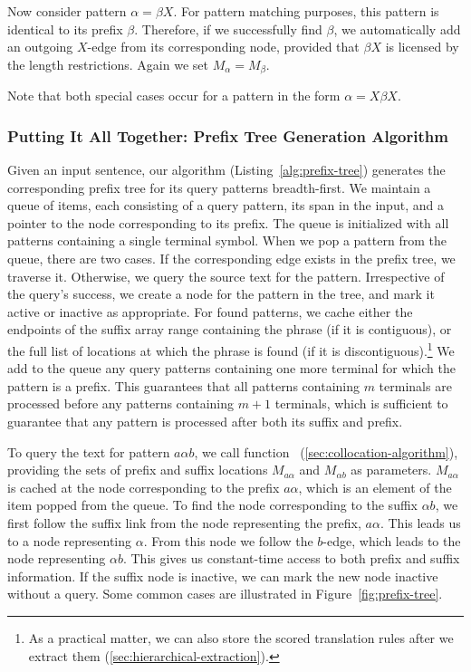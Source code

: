 Now consider pattern $\alpha = \beta{}X$.  For pattern matching purposes,
this pattern is identical to its prefix $\beta$.
Therefore, if we successfully find $\beta$, we automatically
add an outgoing $X$-edge from its corresponding node,
provided that $\beta{}X$ is licensed  
by the length restrictions.  Again we set $M_\alpha = M_\beta$.

Note that both special cases occur for a pattern in the form $\alpha = X\beta{}X$.

\subsubsection{Putting It All Together: Prefix Tree Generation Algorithm}\label{sec:prefix-trees}

Given an input sentence, our algorithm (Listing~\ref{alg:prefix-tree})
generates the corresponding prefix tree for its query patterns breadth-first.
We maintain a queue of items, each consisting of a
query pattern, its span in the input, and a pointer to the node 
corresponding to its prefix.  The queue is initialized
with all patterns containing a single terminal symbol.  When we
pop a pattern from the queue, there are two cases.  If the
corresponding edge exists in the prefix tree,
we traverse it.  Otherwise, we query the source text for 
the pattern.  Irrespective of the query's success, 
we create a node for the pattern in the tree, and
mark it active or inactive as appropriate.  For found patterns, we 
cache either the endpoints of the suffix array range containing
the phrase (if it is contiguous), or the full list of locations at which
the phrase is found (if it is discontiguous).\footnote{As a practical
matter, we can also store the scored translation rules after we extract
them (\textsection\ref{sec:hierarchical-extraction}).}
We add to the queue any query patterns 
containing one more terminal for which the pattern is a prefix.  
This guarantees that all patterns containing $m$ terminals
are processed before any patterns containing $m+1$ terminals,
which is sufficient to guarantee that any pattern is processed
after both its suffix and prefix.

To query the text for pattern $a\alpha{}b$, we 
call function \queryfunc\ (\textsection\ref{sec:collocation-algorithm}), providing 
the sets of prefix and suffix locations
$M_{a\alpha}$ and $M_{\alpha{}b}$ as parameters.  $M_{a\alpha}$ is
cached at the node corresponding to the prefix $a\alpha{}$, 
which is an element of the item popped from the queue.
To find the node corresponding to the suffix $\alpha{}b$, 
we first follow the suffix link from the node representing 
the prefix, $a\alpha$.  This leads us to a node representing
$\alpha$.  From this node we follow the $b$-edge, which
leads to the node representing $\alpha{}b$.  This 
gives us constant-time access to both prefix and suffix information.
If the suffix node is inactive, we can
mark the new node inactive without a query.
Some common cases are illustrated
in Figure~\ref{fig:prefix-tree}.

